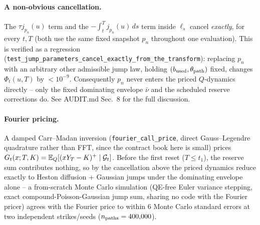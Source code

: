 \paragraph{A non-obvious cancellation.} The $\tau j_{p_n}(u)$ term and the
$-\int_t^T j_{p_n}(u)\,ds$ term inside $\ell_s$ cancel \emph{exactly}, for
every $t,T$ (both use the same fixed snapshot $p_n$ throughout one
evaluation). This is verified as a regression
(\texttt{test\_jump\_parameters\_cancel\_exactly\_from\_the\_transform}):
replacing $p_n$ with an arbitrary other admissible jump law, holding
$(b_{\rm used},\theta_{\rm path})$ fixed, changes $\Phi_t(u,T)$ by
$<10^{-9}$. Consequently $p_n$ never enters the priced $Q$-dynamics
directly -- only the fixed dominating envelope $\bar\nu$ and the scheduled
reserve corrections do. See AUDIT.md Sec.~8 for the full discussion.

\paragraph{Fourier pricing.} A damped Carr--Madan inversion
(\texttt{fourier\_call\_price}, direct Gauss--Legendre quadrature rather
than FFT, since the contract book here is small) prices
$G_t(x;T,K)=\mathbb E_Q[(xY_T-K)^+\mid\mathcal G_t]$. Before the first reset
($T\le t_1$), the reserve sum contributes nothing, so by the cancellation
above the priced dynamics reduce exactly to Heston diffusion + Gaussian
jumps under the dominating envelope alone -- a from-scratch Monte Carlo
simulation (QE-free Euler variance stepping, exact compound-Poisson-Gaussian
jump sum, sharing no code with the Fourier pricer) agrees with the Fourier
price to within 6 Monte Carlo standard errors at two independent
strikes/seeds ($n_{\rm paths}=400{,}000$).
